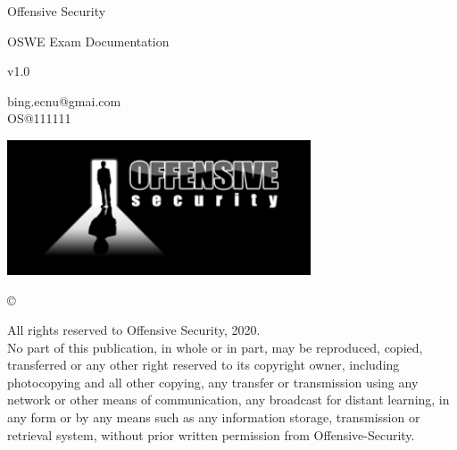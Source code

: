 \documentclass[a4paper]{article}
\begin{document}
\begin{titlepage}
  \begin{center}
      \vspace*{1cm}
          
      
      {\fontsize{48}{48}\selectfont \textcolor{myblue}{Offensive Security}}
          
      \vspace{0.5cm}
      {\fontsize{28}{28}\selectfont \textcolor{myblue}{OSWE Exam Documentation}}
          
      \vspace{1.5cm}
          
      v1.0

      \vspace{1cm}

      bing.ecnu@gmai.com\\
      OS@111111

      \vfill
          
      \includegraphics[width=9cm]{offsec.png}

      \vfill
      
      \copyright
          
      All rights reserved to Offensive Security, 2020.\\
      No part of this publication, in whole or in part, may be reproduced, copied, transferred or any other right reserved to its copyright owner, 
      including photocopying and all other copying, any transfer or transmission using any network or other means of communication, any broadcast
       for distant learning, in any form or by any means such as any information storage, transmission or retrieval system, without prior written
        permission from Offensive-Security.
      
          
      \vspace{0.8cm}
  
  \end{center}
  \thispagestyle{fancy}
\end{titlepage}


\tableofcontents
\end{document}
